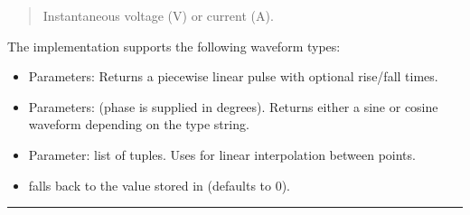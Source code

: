 \documentclass[letterpaper,10pt,english]{sphinxmanual}
\begin{document}
\begin{fulllineitems}
\begin{fulllineitems}
\begin{quote}
\begin{description}
\sphinxAtStartPar
{} \textendash{} Instantaneous voltage (V) or current (A).

\end{description}\end{quote}

\sphinxAtStartPar
The implementation supports the following waveform types:
\begin{itemize}
\item {} 
\sphinxAtStartPar
{}
Parameters: 
Returns a piecewise linear pulse with optional rise/fall times.

\item {} 
\sphinxAtStartPar
{}
Parameters:  (phase is supplied in degrees).
Returns either a sine or cosine waveform depending on the type string.

\item {} 
\sphinxAtStartPar
{}
Parameter:  \textendash{} list of  tuples.
Uses  for linear interpolation between points.

\item {} 
\sphinxAtStartPar
{} \textendash{} falls back to the value stored in  (defaults to 0).

\end{itemize}

\end{fulllineitems}


\end{fulllineitems}



\bigskip\hrule\bigskip
\end{document}
